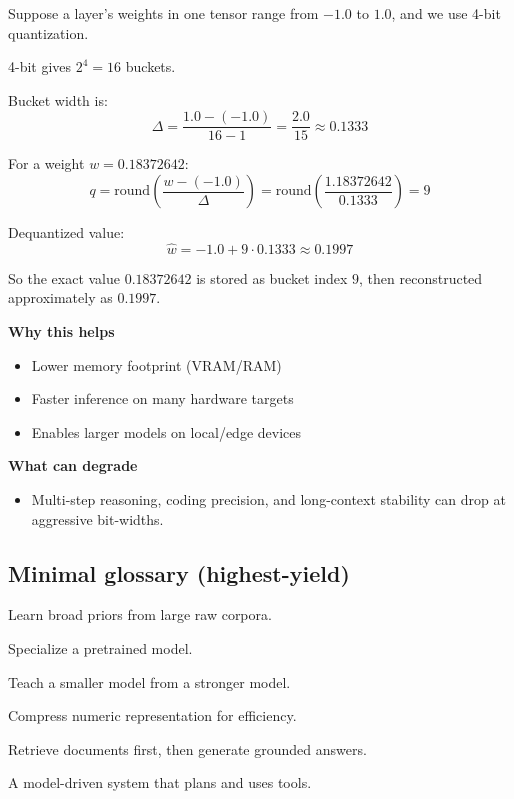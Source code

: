 \begin{notebox}[title=Bucket example]
Suppose a layer's weights in one tensor range from $-1.0$ to $1.0$, and we use 4-bit quantization.

4-bit gives $2^4 = 16$ buckets.

Bucket width is:
\[
\Delta = \frac{1.0 - (-1.0)}{16 - 1} = \frac{2.0}{15} \approx 0.1333
\]

For a weight $w = 0.18372642$:
\[
q = \text{round}\left(\frac{w - (-1.0)}{\Delta}\right)
  = \text{round}\left(\frac{1.18372642}{0.1333}\right)
  = 9
\]

Dequantized value:
\[
\hat{w} = -1.0 + 9 \cdot 0.1333 \approx 0.1997
\]

So the exact value $0.18372642$ is stored as bucket index $9$, then reconstructed approximately as $0.1997$.
\end{notebox}

\textbf{Why this helps}
\begin{itemize}[leftmargin=1.5em]
    \item Lower memory footprint (VRAM/RAM)
    \item Faster inference on many hardware targets
    \item Enables larger models on local/edge devices
\end{itemize}

\textbf{What can degrade}
\begin{itemize}[leftmargin=1.5em]
    \item Multi-step reasoning, coding precision, and long-context stability can drop at aggressive bit-widths.
\end{itemize}

\subsection{Minimal glossary (highest-yield)}

\begin{description}[leftmargin=1.5em, style=nextline]
    \item[Pretraining] Learn broad priors from large raw corpora.
    \item[Fine-tuning] Specialize a pretrained model.
    \item[Distillation] Teach a smaller model from a stronger model.
    \item[Quantization] Compress numeric representation for efficiency.
    \item[RAG] Retrieve documents first, then generate grounded answers.
    \item[Agent] A model-driven system that plans and uses tools.
\end{description}

